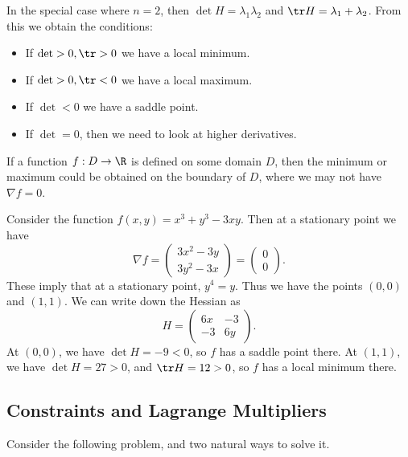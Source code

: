 \documentclass[a4paper]{scrartcl}
\begin{document}
In the special case where $n = 2$, then $\det H = \lambda_1 \lambda_2$ and $\tr H = \lambda_1 + \lambda_2$. From this we obtain the conditions:


\begin{itemize}
	\item If $\det > 0, \tr > 0$ we have a local minimum.
	\item If $\det > 0, \tr < 0$ we have a local maximum.
	\item If $\det < 0$ we have a saddle point.
	\item If $\det = 0$, then we need to look at higher derivatives.
\end{itemize}

\begin{remark}
	If a function $f: D \rightarrow \R$ is defined on some domain $D$, then the minimum or maximum could be obtained on the boundary of $D$, where we may not have $\nabla f = 0$.
\end{remark}

\begin{example}
	Consider the function $f(x, y) = x^3 + y^3 - 3xy$. Then at a stationary point we have
	$$
\nabla f = \begin{pmatrix}
	3x^2 - 3y \\
	3y^2 - 3x
\end{pmatrix} = \begin{pmatrix}
	0 \\ 0
\end{pmatrix}.
	$$
	These imply that at a stationary point, $y^4 = y$. Thus we have the points $(0, 0)$ and $(1, 1)$. We can write down the Hessian as
	$$
	H = \begin{pmatrix}
		6x & -3 \\ -3 & 6y
	\end{pmatrix}.
	$$
	At $(0, 0)$, we have $\det H = -9 < 0$, so $f$ has a saddle point there. At $(1, 1)$, we have $\det H = 27 > 0$, and $\tr H = 12 > 0$, so $f$ has a local minimum there.
\end{example}

\subsection{Constraints and Lagrange Multipliers}\label{sec:lm}

Consider the following problem, and two natural ways to solve it.
\end{document}
